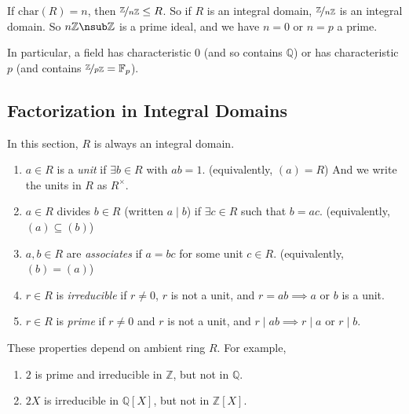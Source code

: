 \begin{remark}
    If \(\mathrm{char}(R) = n\), then \(\nicefrac{\mathbb{Z}}{n\mathbb{Z}}\leq R\). So if \(R\) is an integral domain, \(\nicefrac{\mathbb{Z}}{n\mathbb{Z}}\) is an integral domain. So \(n\mathbb{Z} \nsub \mathbb{Z}\) is a prime ideal, and we have \(n = 0\) or \(n = p\) a prime.

    In particular, a field has characteristic \(0\) (and so contains \(\mathbb{Q}\)) or has characteristic \(p\) (and contains \(\nicefrac{\mathbb{Z}}{p\mathbb{Z}} = \mathbb{F}_p\)).
\end{remark}
\subsection{Factorization in Integral Domains}
In this section, \(R\) is always an integral domain.
\begin{definition}
    \leavevmode
    \begin{enumerate}
        \item \(a \in R\) is a \textit{unit} if \(\exists b\in R\) with \(ab = 1\). (equivalently, \((a) = R\)) And we write the units in \(R\) as \(R^\times \).
        \item \(a \in R\) divides \(b \in R\) (written \(a \mid b\)) if \(\exists c \in R\) such that \(b = ac\). (equivalently, \((a) \subseteq (b)\))
        \item \(a,b \in R\) are \textit{associates}  if \(a = bc\) for some unit \(c \in R\). (equivalently, \((b) = (a)\))
        \item \(r \in R\) is \textit{irreducible} if \(r\neq 0\), \(r\) is not a unit, and \(r = ab \implies a\) or \(b\) is a unit.
        \item \(r \in R\) is \textit{prime}  if \(r \neq 0\) and \(r\) is not a unit, and \(r\mid ab \implies r \mid a\) or \(r\mid b\).
    \end{enumerate}
\end{definition}
\begin{note}
    These properties depend on ambient ring \(R\). For example,
    \begin{enumerate}
    \item \(2\) is prime and irreducible in \(\mathbb{Z}\), but not in \(\mathbb{Q}\).
    \item \(2X\) is irreducible in \(\mathbb{Q}[X]\), but not in \(\mathbb{Z}[X]\).
    \end{enumerate}
\end{note}
